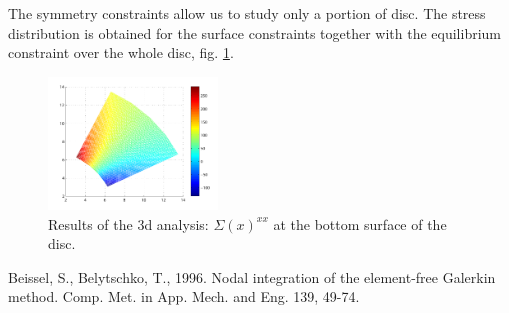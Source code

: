 \documentclass{article}
\begin{document}
The symmetry constraints allow us to study only a portion of disc. The stress distribution is obtained for the surface constraints together with the equilibrium constraint over the whole disc, fig. \ref{fig6}.


\begin{figure}[ht!]
    \centering
            \includegraphics[width=0.4\textwidth]{discbotsigxx.pdf}
    \caption{Results of the 3d analysis: $\Sigma(x)^{xx}$ at the bottom surface of the disc.}
    \label{fig6}
\end{figure}





\small
\begin{thebibliography}{99}
\setlength{\itemsep}{-0.5mm}
 Beissel, S., Belytschko, T., 1996. Nodal integration of the element-free Galerkin method. Comp. Met. in App. Mech. and Eng. 139, 49-74.
%
\end{thebibliography}
\end{document}
